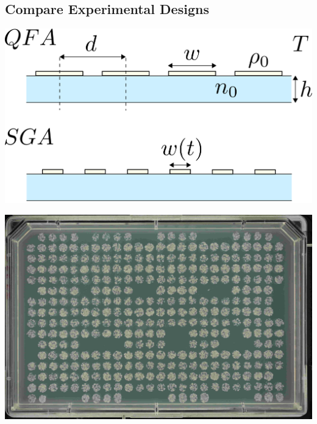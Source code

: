 \subsection{Compare Experimental Designs}
\label{sec:comp-exper-designs}


\begin{Figure}
  \centering
  \includegraphics[width=\linewidth]{qfa_v_sga_vars}
\end{Figure}



\begin{Figure}
  \centering
  \includegraphics[width=\linewidth]{DLR00012647-2009-07-02_23-12-49}
\end{Figure}


